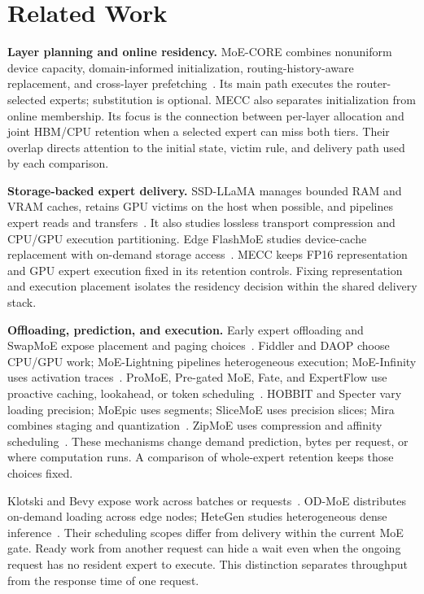 \documentclass[conference,9pt,letterpaper]{IEEEtran}
\begin{document}
\balance
\section{Related Work}
\textbf{Layer planning and online residency.} MoE-CORE combines nonuniform device capacity, domain-informed initialization, routing-history-aware replacement, and cross-layer prefetching~\cite{core}. Its main path executes the router-selected experts; substitution is optional. MECC also separates initialization from online membership. Its focus is the connection between per-layer allocation and joint HBM/CPU retention when a selected expert can miss both tiers. Their overlap directs attention to the initial state, victim rule, and delivery path used by each comparison.

\textbf{Storage-backed expert delivery.} SSD-LLaMA manages bounded RAM and VRAM caches, retains GPU victims on the host when possible, and pipelines expert reads and transfers~\cite{ssdllama}. It also studies lossless transport compression and CPU/GPU execution partitioning. Edge FlashMoE studies device-cache replacement with on-demand storage access~\cite{flashmoe}. MECC keeps FP16 representation and GPU expert execution fixed in its retention controls. Fixing representation and execution placement isolates the residency decision within the shared delivery stack.

\textbf{Offloading, prediction, and execution.} Early expert offloading and SwapMoE expose placement and paging choices~\cite{offloading,swapmoe}. Fiddler and DAOP choose CPU/GPU work; MoE-Lightning pipelines heterogeneous execution; MoE-Infinity uses activation traces~\cite{fiddler,daop,lightning,moeinfinity}. ProMoE, Pre-gated MoE, Fate, and ExpertFlow use proactive caching, lookahead, or token scheduling~\cite{promoe,pregated,fate,expertflow}. HOBBIT and Specter vary loading precision; MoEpic uses segments; SliceMoE uses precision slices; Mira combines staging and quantization~\cite{hobbit,specter,moepic,slicemoe,mira}. ZipMoE uses compression and affinity scheduling~\cite{zipmoe}. These mechanisms change demand prediction, bytes per request, or where computation runs. A comparison of whole-expert retention keeps those choices fixed.

Klotski and Bevy expose work across batches or requests~\cite{klotski,bevy}. OD-MoE distributes on-demand loading across edge nodes; HeteGen studies heterogeneous dense inference~\cite{odmoe,hetegen}. Their scheduling scopes differ from delivery within the current MoE gate. Ready work from another request can hide a wait even when the ongoing request has no resident expert to execute. This distinction separates throughput from the response time of one request.
\end{document}
